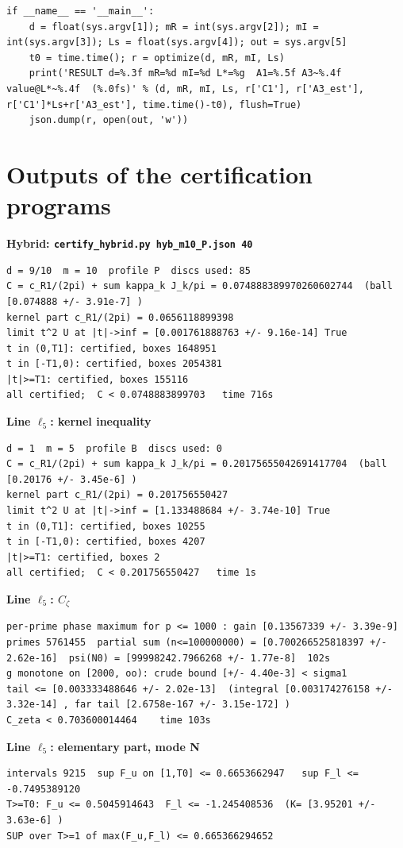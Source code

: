 \documentclass[11pt,reqno]{amsart}
\numberwithin{equation}{section}
\theoremstyle{definition}
\theoremstyle{remark}
\newcommand{\appsub}[1]{\par\medskip\noindent\textbf{#1}\par\nobreak\smallskip}
\begin{document}
\begin{lstlisting}
if __name__ == '__main__':
    d = float(sys.argv[1]); mR = int(sys.argv[2]); mI = int(sys.argv[3]); Ls = float(sys.argv[4]); out = sys.argv[5]
    t0 = time.time(); r = optimize(d, mR, mI, Ls)
    print('RESULT d=%.3f mR=%d mI=%d L*=%g  A1=%.5f A3~%.4f  value@L*~%.4f  (%.0fs)' % (d, mR, mI, Ls, r['C1'], r['A3_est'], r['C1']*Ls+r['A3_est'], time.time()-t0), flush=True)
    json.dump(r, open(out, 'w'))
\end{lstlisting}
\section{Outputs of the certification programs}\label{app:cert}
\appsub{Hybrid: \texttt{certify\_hybrid.py hyb\_m10\_P.json 40}}
\label{app:out_hybrid}
\begin{lstlisting}
d = 9/10  m = 10  profile P  discs used: 85
C = c_R1/(2pi) + sum kappa_k J_k/pi = 0.074888389970260602744  (ball [0.074888 +/- 3.91e-7] )
kernel part c_R1/(2pi) = 0.0656118899398
limit t^2 U at |t|->inf = [0.001761888763 +/- 9.16e-14] True
t in (0,T1]: certified, boxes 1648951
t in [-T1,0): certified, boxes 2054381
|t|>=T1: certified, boxes 155116
all certified;  C < 0.0748883899703   time 716s
\end{lstlisting}
\appsub{Line $\ell_{5}$: kernel inequality}
\begin{lstlisting}
d = 1  m = 5  profile B  discs used: 0
C = c_R1/(2pi) + sum kappa_k J_k/pi = 0.20175655042691417704  (ball [0.20176 +/- 3.45e-6] )
kernel part c_R1/(2pi) = 0.201756550427
limit t^2 U at |t|->inf = [1.133488684 +/- 3.74e-10] True
t in (0,T1]: certified, boxes 10255
t in [-T1,0): certified, boxes 4207
|t|>=T1: certified, boxes 2
all certified;  C < 0.201756550427   time 1s
\end{lstlisting}
\appsub{Line $\ell_{5}$: $C_\zeta$}
\begin{lstlisting}
per-prime phase maximum for p <= 1000 : gain [0.13567339 +/- 3.39e-9]
primes 5761455  partial sum (n<=100000000) = [0.700266525818397 +/- 2.62e-16]  psi(N0) = [99998242.7966268 +/- 1.77e-8]  102s
g monotone on [2000, oo): crude bound [+/- 4.40e-3] < sigma1
tail <= [0.003333488646 +/- 2.02e-13]  (integral [0.003174276158 +/- 3.32e-14] , far tail [2.6758e-167 +/- 3.15e-172] )
C_zeta < 0.703600014464    time 103s
\end{lstlisting}
\appsub{Line $\ell_{5}$: elementary part, mode N}
\begin{lstlisting}
intervals 9215  sup F_u on [1,T0] <= 0.6653662947   sup F_l <= -0.7495389120
T>=T0: F_u <= 0.5045914643  F_l <= -1.245408536  (K= [3.95201 +/- 3.63e-6] )
SUP over T>=1 of max(F_u,F_l) <= 0.665366294652
\end{lstlisting}
\end{document}
